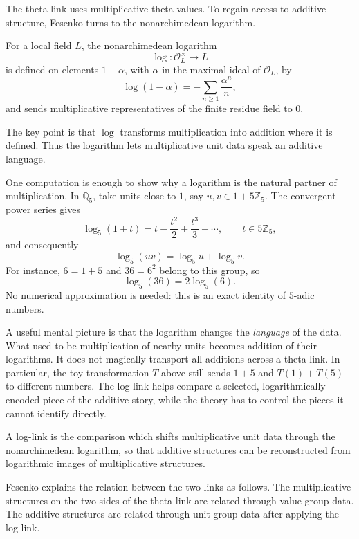 The theta-link uses multiplicative theta-values.  To regain access to additive structure, Fesenko turns to the nonarchimedean logarithm.

\begin{definition}
For a local field \(L\), the nonarchimedean logarithm
\[
  \log:\mathcal O_L^{\times}\longrightarrow L
\]
is defined on elements \(1-\alpha\), with \(\alpha\) in the maximal ideal of \(\mathcal O_L\), by
\[
  \log(1-\alpha)=-\sum_{n\geq1}\frac{\alpha^n}{n},
\]
and sends multiplicative representatives of the finite residue field to \(0\).
\end{definition}

The key point is that \(\log\) transforms multiplication into addition where it is defined.  Thus the logarithm lets multiplicative unit data speak an additive language.

One computation is enough to show why a logarithm is the natural partner of multiplication. In $\mathbb Q_5$, take units close to $1$, say $u,v\in1+5\mathbb Z_5$. The convergent power series gives
\[
 \log_5(1+t)=t-\frac{t^2}{2}+\frac{t^3}{3}-\cdots,
 \qquad t\in5\mathbb Z_5,
\]
and consequently
\[
 \boxed{\log_5(uv)=\log_5 u+\log_5 v.}
\]
For instance, $6=1+5$ and $36=6^2$ belong to this group, so
\[
 \log_5(36)=2\log_5(6).
\]
No numerical approximation is needed: this is an exact identity of $5$-adic numbers.

A useful mental picture is that the logarithm changes the \emph{language} of the data. What used to be multiplication of nearby units becomes addition of their logarithms. It does not magically transport all additions across a theta-link. In particular, the toy transformation $T$ above still sends $1+5$ and $T(1)+T(5)$ to different numbers. The log-link helps compare a selected, logarithmically encoded piece of the additive story, while the theory has to control the pieces it cannot identify directly.

\begin{definition}
A log-link is the comparison which shifts multiplicative unit data through the nonarchimedean logarithm, so that additive structures can be reconstructed from logarithmic images of multiplicative structures.
\end{definition}

Fesenko explains the relation between the two links as follows.  The multiplicative structures on the two sides of the theta-link are related through value-group data.  The additive structures are related through unit-group data after applying the log-link.

